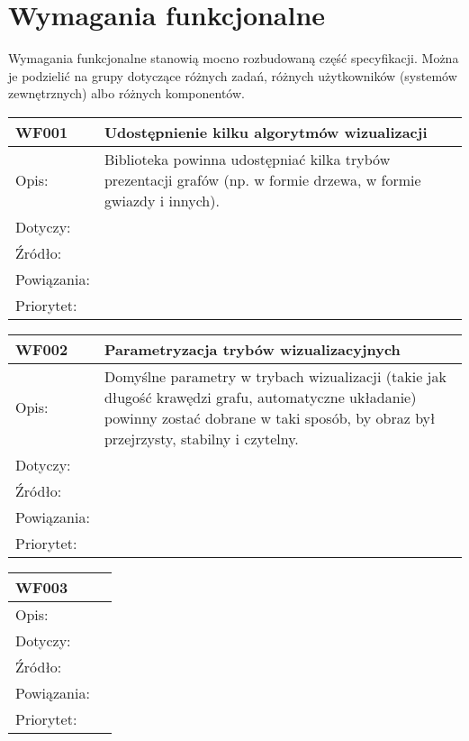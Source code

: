 \documentclass[a4paper,10pt]{article}
\begin{document}
\section{Wymagania funkcjonalne}

Wymagania funkcjonalne stanowią mocno rozbudowaną część specyfikacji. Można je podzielić na grupy dotyczące różnych zadań, różnych użytkowników (systemów zewnętrznych) albo różnych komponentów.

\begin{center}
\begin{tabular}{|l|l|} \hline

WF001 & Udostępnienie kilku algorytmów wizualizacji \\ \hline
Opis: & Biblioteka powinna udostępniać kilka trybów prezentacji grafów (np. w formie drzewa, w formie gwiazdy i innych).    \\ \hline
Dotyczy: &  \\ \hline
Źródło: &  \\ \hline
Powiązania: & \\ \hline
Priorytet: &  \\ \hline

\end{tabular}
\end{center}
\begin{center}
\begin{tabular}{|l|l|} \hline

WF002 & Parametryzacja trybów wizualizacyjnych \\ \hline
Opis: & Domyślne parametry w trybach wizualizacji (takie jak długość krawędzi grafu, automatyczne układanie) powinny zostać dobrane w taki sposób, by obraz był przejrzysty, stabilny i czytelny.    \\ \hline
Dotyczy: &  \\ \hline
Źródło: &  \\ \hline
Powiązania: & \\ \hline
Priorytet: &  \\ \hline

\end{tabular}
\end{center}




\begin{tabular}{|l|l|} \hline

WF003 &   \\ \hline
Opis: &     \\ \hline
Dotyczy: &  \\ \hline
Źródło: &  \\ \hline
Powiązania: & \\ \hline
Priorytet: &  \\ \hline

\end{tabular}
\end{document}
